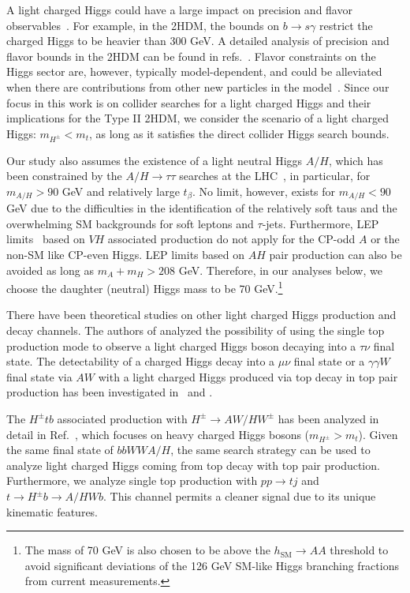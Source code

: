  A light charged Higgs could have a large impact on precision and flavor observables~\cite{Olive2016}. For example, in the 2HDM, the bounds on $b\rightarrow s\gamma$ restrict the charged Higgs to be heavier than 300 GeV. A detailed analysis of precision and flavor bounds in the 2HDM can be found in refs.~\cite{Coleppa:2013dya,Mahmoudi:2009zx}. Flavor constraints on the Higgs sector are, however, typically model-dependent, and could be alleviated when there are contributions from other new particles in the model~\cite{Han:2013mga}. Since our focus in this work is on collider searches for a light charged Higgs and their implications for the Type II 2HDM, we consider the scenario of a light charged Higgs: $m_{H^{\pm}}<m_t$, as long as it satisfies the direct collider Higgs search bounds.

Our study also assumes the existence of a light neutral Higgs $A/H$, which has been constrained by the $A/H \rightarrow \tau\tau$ searches at the LHC~\cite{Khachatryan:2014wca,Aad:2014vgg}, in particular, for $m_{A/H}>90$ GeV and relatively large $t_{\beta}$. No limit, however, exists for $m_{A/H}<90$ GeV due to the difficulties in the identification of the relatively soft taus and the overwhelming SM backgrounds for soft leptons and $\tau$-jets. Furthermore, LEP limits~\cite{LEP_Higgs} based on $VH$ associated production do not apply for the CP-odd $A$ or the non-SM like CP-even Higgs. LEP limits based on $AH$ pair production can also be avoided as long as $m_A+m_H>208$ GeV. Therefore, in our analyses below, we choose the daughter (neutral) Higgs mass to be 70 GeV.\footnote{The mass of 70 GeV is also chosen to be above the $h_\text{SM} \rightarrow AA$ threshold to avoid significant deviations of the 126 GeV SM-like Higgs branching fractions from current measurements.}

There have been theoretical studies on other light charged Higgs production and decay channels. The authors of \cite{Guedes:2012eu,Hashemi:2013kga} analyzed the possibility of using the single top production mode to observe a light charged Higgs boson decaying into a $\tau\nu$ final state. The detectability of a charged Higgs decay into a $ \mu \nu $ final state or a $\gamma\gamma W$ final state via $AW$ with a light charged Higgs produced via top decay in top pair production has been investigated in~\cite{Hashemi:2011gy} and \cite{Das:2014fha}. 

The $H^{\pm} tb$ associated production with $H^{\pm}\rightarrow AW/HW^{\pm} $ has been analyzed in detail in Ref.~\cite{Coleppa:2014cca}, which focuses on heavy charged Higgs bosons ($m_{H^{\pm}}>m_t$). Given the same final state of $bbWWA/H$, the same search strategy can be used to analyze light charged Higgs coming from top decay with top pair production. Furthermore, we analyze single top production with $pp \rightarrow tj$ and $t \rightarrow H^{\pm} b \rightarrow A/HWb $. This channel permits a cleaner signal due to its unique kinematic features. 



